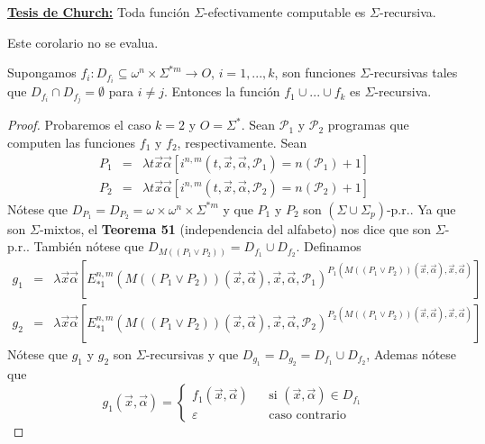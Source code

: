   \noindent \textbf{\underline{Tesis de Church:}} Toda función $\Sigma $-efectivamente computable es $\Sigma $-recursiva.

  \begin{corollary}
    \par Este corolario no se evalua.
  \end{corollary}

  \begin{lemma}
    Supongamos $f_{i}:D_{f_{i}}\subseteq \omega ^{n}\times \Sigma ^{\ast m}\rightarrow O$, $i=1,...,k$,
    son funciones $\Sigma $-recursivas tales que $D_{f_{i}}\cap D_{f_{j}}=\emptyset $ para $i\neq j$.
    Entonces la función $f_{1}\cup ...\cup f_{k}$ es $\Sigma $-recursiva.
  \begin{proof}
    Probaremos el caso $k=2$ y $O=\Sigma ^{\ast }$. Sean $\mathcal{P}_{1}$ y $ \mathcal{P}_{2}$ programas que
    computen las funciones $f_{1}$ y $f_{2}$, respectivamente. Sean
    \[
      \displaystyle
      \begin{array}{rcl}
        P_{1} & =& \lambda t\vec{x}\vec{\alpha}\left[ i^{n,m}(t,\vec{x},\vec{\alpha},
          \mathcal{P}_{1})=n(\mathcal{P}_{1})+1\right] \\
        P_{2} & =& \lambda t\vec{x}\vec{\alpha}\left[ i^{n,m}(t,\vec{x},\vec{\alpha},
          \mathcal{P}_{2})=n(\mathcal{P}_{2})+1\right]
      \end{array}
    \]
    Nótese que $D_{P_{1}}=D_{P_{2}}=\omega \times \omega ^{n}\times \Sigma ^{\ast m}$ y que $P_{1}$ y $P_{2}$
    son $(\Sigma \cup \Sigma _{p})$-p.r.. Ya que son $\Sigma $-mixtos, el \textbf{Teorema 51}
    (independencia del alfabeto) nos dice que son
    $\Sigma $-p.r.. También nótese que $D_{M((P_{1}\vee P_{2}))}=D_{f_{1}}\cup D_{f_{2}}$. Definamos
    \[
      \displaystyle
        \begin{array}{rcl}
          g_{1} & =& \lambda \vec{x}\vec{\alpha}\left[ E_{\ast 1}^{n,m}(M\left( (P_{1}\vee P_{2})\right)
            (\vec{x},\vec{\alpha}),\vec{x},\vec{\alpha}, \mathcal{P}_{1})^{P_{1}(M\left( (P_{1}\vee P_{2})\right)
            (\vec{x},\vec{\alpha }),\vec{x},\vec{\alpha})}\right] \\
          g_{2} & =& \lambda \vec{x}\vec{\alpha}\left[ E_{\ast 1}^{n,m}(M\left( (P_{1}\vee P_{2})\right)
            (\vec{x},\vec{\alpha}),\vec{x},\vec{\alpha}, \mathcal{P}_{2})^{P_{2}(M\left( (P_{1}\vee P_{2})\right)
            (\vec{x},\vec{\alpha }),\vec{x},\vec{\alpha})}\right]
        \end{array}
    \]
    Nótese que $g_{1}$ y $g_{2}$ son $\Sigma $-recursivas y que $ D_{g_{1}}=D_{g_{2}}=D_{f_{1}}\cup D_{f_{2}}$,
    Ademas nótese que
    \[
      \displaystyle
        g_{1}(\vec{x},\vec{\alpha})=\left\{
          \begin{array}{lll}
            f_{1}(\vec{x},\vec{\alpha}) & & \text{si } (\vec{x},\vec{\alpha})\in D_{f_{1}} \\
            \varepsilon & & \text{caso contrario}
          \end{array} \right.
    \]


\end{proof}
\end{lemma}
